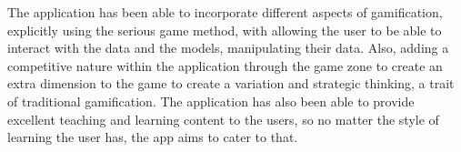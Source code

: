	The application has been able to incorporate different aspects of gamification, explicitly using the serious game method, with allowing the user to be able to interact with the data and the models, manipulating their data. Also, adding a competitive nature within the application through the game zone to create an extra dimension to the game to create a variation and strategic thinking, a trait of traditional gamification. The application has also been able to provide excellent teaching and learning content to the users, so no matter the style of learning the user has, the app aims to cater to that.